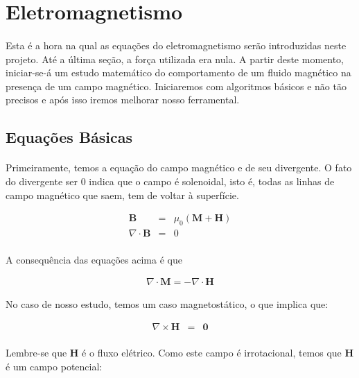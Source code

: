 \documentclass[eletromagnetismo.tex]{subfiles}
\begin{document}
\section{Eletromagnetismo}

\paragraph{} Esta é a hora na qual as equações do eletromagnetismo serão introduzidas neste projeto. Até a última seção, a força utilizada era nula. A partir deste momento, iniciar-se-á um estudo matemático do comportamento de um fluido magnético na presença de um campo magnético. Iniciaremos com algoritmos básicos e não tão precisos e após isso iremos melhorar nosso ferramental. 

\subsection{Equações Básicas}

\paragraph{} Primeiramente, temos a equação do campo magnético e de seu divergente. O fato do divergente ser 0 indica que o campo é solenoidal, isto é, todas as linhas de campo magnético que saem, tem de voltar à superfície.

\begin{eqnarray}
\mathbf{B} &=& \mu_0(\mathbf{M}+\mathbf{H})\\
\nabla\cdot \mathbf{B} & = & 0
\end{eqnarray}

\paragraph{} A consequência das equações acima é que 

\begin{eqnarray}
\nabla\cdot \mathbf{M} = -\nabla\cdot\mathbf{H}	\label{mh1}
\end{eqnarray}


No caso de nosso estudo, temos um caso magnetostático, o que implica que:

\begin{eqnarray}
\nabla\times \mathbf{H} & = & \mathbf{0}
\end{eqnarray}

\paragraph{} Lembre-se que $\mathbf{H}$ é o fluxo elétrico. Como este campo é irrotacional, temos que $\mathbf{H}$ é um campo potencial:
\end{document}
